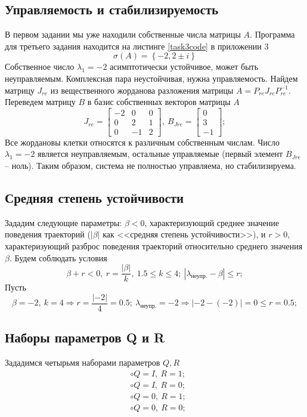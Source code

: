 \documentclass[a4paper, 12pt]{article}
\begin{document}
    \subsection{Управляемость и стабилизируемость}
    В первом задании мы уже находили собственные числа матрицы $A$. Программа для третьего задания
    находится на листинге \ref{task3code} в приложении 3
    $$
    \sigma\left( A \right)=\left\{ -2,2\pm i \right\}
    $$
    Собственное число $\lambda_1=-2$ асимптотически устойчивое, может быть неуправляемым. Комплексная пара неустойчивая,
    нужна управляемость. Найдем матрицу $J_{re}$ из вещественного жорданова разложения матрицы $A=P_{re}J_{re}P_{re}^{-1}$.
    Переведем матрицу $B$ в базис собственных векторов матрицы $A$
    $$
    J_{re}=\begin{bmatrix}
    -2     &0     &0\\
    0     &2     &1\\
    0    &-1     &2
    \end{bmatrix},\ B_{Jre}=\begin{bmatrix}
        0\\
     3\\
    -1
    \end{bmatrix};
    $$
    Все жордановы клетки относятся к различным собственным числам. Число $\lambda_1=-2$ является неуправляемым,
    остальные управляемые (первый элемент $B_{Jre}$ -- ноль). Таким образом, система не полностью управляема,
    но стабилизируема.


    \subsection{Средняя степень устойчивости}
    Зададим следующие параметры: $\beta<0$,
    характеризующий среднее значение поведения
    траекторий ($|\beta|$ как <<средняя степень устойчивости>>),
    и $r>0$, характеризующий разброс поведения траекторий относительно
    среднего значения $\beta$. Будем соблюдать условия
    $$
    \beta+r<0,\ r=\dfrac{|\beta|}{k},\ 1.5\leq k\leq 4;\ |\lambda_{\text{неупр.}}-\beta|\leq r;
    $$
    Пусть
    $$
    \beta=-2,\ k=4\Rightarrow r=\dfrac{|-2|}{4}=0.5;\ \lambda_{\text{неупр.}}=-2\Rightarrow |-2-(-2)|=0\leq r=0.5;
    $$


    \subsection{Наборы параметров Q и R}
    Зададимся четырьмя наборами параметров $Q,R$
    \begin{align*}
        &\circ Q=I,\ R=1;\\
        &\circ Q=I,\ R=0;\\
        &\circ Q=0,\ R=1;\\
        &\circ Q=0,\ R=0;
    \end{align*}
\end{document}
